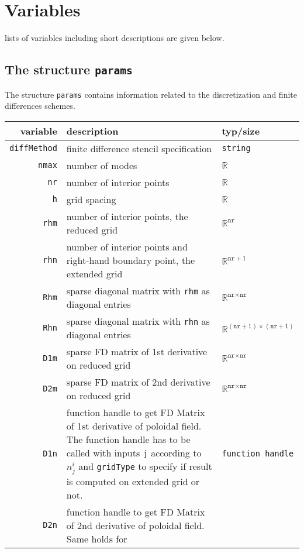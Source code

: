 \section{Variables}
lists of variables including short descriptions are given below.
\subsection{The structure \texttt{params}}
The structure \texttt{params} contains information related to the discretization and finite differences 
schemes.
\begin{center}
\begin{tabularx}{\textwidth}{rXl}
	variable & description & typ/size\\\hline
	\texttt{diffMethod} & finite difference stencil specification & \texttt{string}\\
	\texttt{nmax} & number of modes & $\mathbb{R}$\\
	\texttt{nr} & number of interior points & $\mathbb{R}$\\
	\texttt{h} & grid spacing & $\mathbb{R}$\\	
	\texttt{rhm} & number of interior points, the reduced grid & $\mathbb{R}^\texttt{nr}$\\
	\texttt{rhn} & number of interior points and right-hand boundary point, the extended grid & 
	$\mathbb{R}^{\texttt{nr}+1}$\\
	\texttt{Rhm} & sparse diagonal matrix with \texttt{rhm} as diagonal entries & 
															$\mathbb{R}^{\texttt{nr}\times\texttt{nr}}$\\
	\texttt{Rhn} & sparse diagonal matrix with \texttt{rhn} as diagonal entries &
								 $\mathbb{R}^{\left(\texttt{nr}+1\right)\times\left(\texttt{nr}+1\right)}$\\
	\texttt{D1m} & sparse FD matrix of 1st derivative on reduced grid &
															$\mathbb{R}^{\texttt{nr}\times\texttt{nr}}$\\
	\texttt{D2m} & sparse FD matrix of 2nd derivative on reduced grid & 
															$\mathbb{R}^{\texttt{nr}\times\texttt{nr}}$\\
	\texttt{D1n} & function handle to get FD Matrix of 1st derivative of poloidal field. The function handle
	has to be called with inputs \texttt{j} according to $n^i_j$ and \texttt{gridType} to specify if result 
	is computed on extended grid or not. & \texttt{function handle}\\
	\texttt{D2n} & function handle to get FD Matrix of 2nd derivative of poloidal field. Same holds for 

\end{tabularx}
\end{center}
